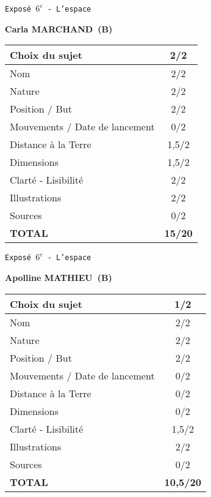 	\vspace*{1cm}
	
	\newpage
	\LARGE{\texttt{Expos\'e $6^e$ - L'espace}}
	\vspace*{1cm}

	\textbf{Carla MARCHAND\ (B)}

	\vspace*{1.5cm}
	\begin{tabular}{|l|c|}
		\hline
		Choix du sujet & 2/2 \\
		\hline
		Nom & 2/2 \\
		\hline
		Nature & 2/2 \\
		\hline
		Position / But & 2/2 \\
		\hline
		Mouvements / Date de lancement & 0/2 \\
		\hline
		Distance \`a la Terre & 1,5/2 \\
		\hline
		Dimensions & 1,5/2 \\
		\hline
		Clart\'e - Lisibilit\'e & 2/2 \\
		\hline
		Illustrations & 2/2 \\
		\hline
		Sources & 0/2 \\
		\hline
		\textbf{TOTAL}  & \textbf{15/20} \\
		\hline
	\end{tabular}

	\vspace*{1cm}
	
	\newpage
	\LARGE{\texttt{Expos\'e $6^e$ - L'espace}}
	\vspace*{1cm}

	\textbf{Apolline MATHIEU\ (B)}

	\vspace*{1.5cm}
	\begin{tabular}{|l|c|}
		\hline
		Choix du sujet & 1/2 \\
		\hline
		Nom & 2/2 \\
		\hline
		Nature & 2/2 \\
		\hline
		Position / But & 2/2 \\
		\hline
		Mouvements / Date de lancement & 0/2 \\
		\hline
		Distance \`a la Terre & 0/2 \\
		\hline
		Dimensions & 0/2 \\
		\hline
		Clart\'e - Lisibilit\'e & 1,5/2 \\
		\hline
		Illustrations & 2/2 \\
		\hline
		Sources & 0/2 \\
		\hline
		\textbf{TOTAL}  & \textbf{10,5/20} \\
		\hline
	\end{tabular}

